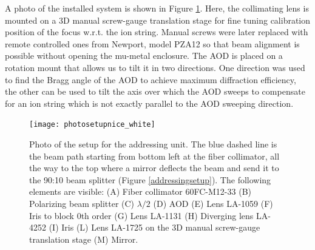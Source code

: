 A photo of the installed system is shown in Figure \ref{photosetup}. Here, the collimating lens is mounted on a 3D manual screw-gauge translation stage for fine tuning calibration position of the focus w.r.t. the ion string. Manual screws were later replaced with remote controlled ones from Newport, model PZA12 so that beam alignment is possible without opening the mu-metal enclosure. The AOD is placed on a rotation mount that allows us to tilt it in two directions. One direction was used to find the Bragg angle of the AOD to achieve maximum diffraction efficiency, the other can be used to tilt the axis over which the AOD sweeps to compensate for an ion string which is not exactly parallel to the AOD sweeping direction.

\begin{figure}
\centering
\texttt{[image: photosetupnice\_white]}
\caption{Photo of the setup for the addressing unit. The blue dashed line is the beam path starting from bottom left at the fiber collimator, all the way to the top where a mirror deflects the beam and send it to the 90:10 beam splitter (Figure \ref{addressingsetup}). The following elements are visible: (A) Fiber collimator 60FC-M12-33 (B) Polarizing beam splitter (C) $\lambda/2$ (D) AOD (E) Lens LA-1059 (F) Iris to block 0th order (G) Lens LA-1131 (H) Diverging lens LA-4252 (I) Iris (L) Lens LA-1725 on the 3D manual screw-gauge translation stage (M) Mirror. }
\label{photosetup}
\end{figure}
